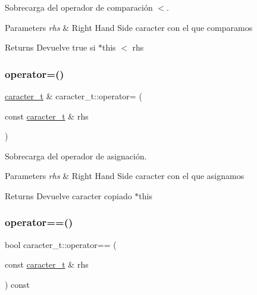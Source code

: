 Sobrecarga del operador de comparación $<$. 


\begin{DoxyParams}{Parameters}
{\em rhs} & Right Hand Side caracter con el que comparamos \\
\hline
\end{DoxyParams}
\begin{DoxyReturn}{Returns}
Devuelve true si $\ast$this $<$ rhs 
\end{DoxyReturn}
\mbox{\label{classcaracter__t_ae96b9e606ea56bcafb360c6d40296ce5}} 
\subsubsection{\texorpdfstring{operator=()}{operator=()}}
{\footnotesize\ttfamily \hyperlink{classcaracter__t}{caracter\+\_\+t} \& caracter\+\_\+t\+::operator= (\begin{DoxyParamCaption}\item[{const \hyperlink{classcaracter__t}{caracter\+\_\+t} \&}]{rhs }\end{DoxyParamCaption})}



Sobrecarga del operador de asignación. 


\begin{DoxyParams}{Parameters}
{\em rhs} & Right Hand Side caracter con el que asignamos \\
\hline
\end{DoxyParams}
\begin{DoxyReturn}{Returns}
Devuelve caracter copiado $\ast$this 
\end{DoxyReturn}
\mbox{\label{classcaracter__t_a0d7683da248d753f3c9359a18b61592e}} 
\subsubsection{\texorpdfstring{operator==()}{operator==()}}
{\footnotesize\ttfamily bool caracter\+\_\+t\+::operator== (\begin{DoxyParamCaption}\item[{const \hyperlink{classcaracter__t}{caracter\+\_\+t} \&}]{rhs }\end{DoxyParamCaption}) const}



